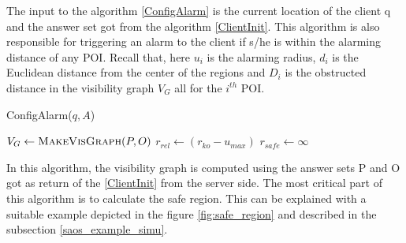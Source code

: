 \documentclass{sig-alternate}
\begin{document}
The input to the algorithm \ref{ConfigAlarm} is the current location of the client q and the answer set got from the algorithm \ref{ClientInit}. This algorithm is also responsible for triggering an alarm to the client if s/he is within the alarming distance of any POI. Recall that, here $u_i$ is the alarming radius, $d_i$ is the Euclidean distance from the center of the regions and $D_i$ is the obstructed distance in the visibility graph $V_G$ all for the $i^{th}$ POI.
\begin{algorithm}
\caption{ConfigAlarm($q, A$)}
\label{ConfigAlarm}

    
     $V_G \gets \textsc{MakeVisGraph}(P, O)$ \;
     $r_{rel} \gets (r_{ko} - u_{max})$ \;
     $r_{safe} \gets \infty$ \;
    
    

\end{algorithm}

In this algorithm, the visibility graph is computed using the answer sets P and O got as return of the \ref{ClientInit} from the server side. The most critical part of this algorithm is to calculate the safe region. This can be explained with a suitable example depicted in the figure \ref{fig:safe_region} and described in the subsection \ref{saos_example_simu}.
\end{document}
